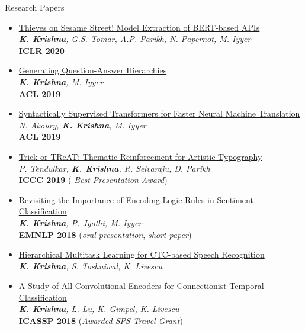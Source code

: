 \documentclass{resume} %
\begin{document}
\begin{rSection}{Research Papers}
\vspace*{0.1in}
\begin{itemize}[leftmargin=*]
\item \href{https://arxiv.org/abs/1910.12366}{Thieves on Sesame Street! Model Extraction of BERT-based APIs} \\ \textit{\textbf{K. Krishna}, G.S. Tomar, A.P. Parikh, N. Papernot, M. Iyyer} \\ \textbf{ICLR 2020}
\item \href{https://arxiv.org/abs/1906.02622}{Generating Question-Answer Hierarchies} \\ \textit{\textbf{K. Krishna}, M. Iyyer} \\ \textbf{ACL 2019}
\item \href{https://arxiv.org/abs/1906.02780}{Syntactically Supervised Transformers for Faster Neural Machine Translation} \\ \textit{N. Akoury, \textbf{K. Krishna}, M. Iyyer} \\ \textbf{ACL 2019}
\item \href{https://arxiv.org/abs/1903.07820}{Trick or TReAT: Thematic Reinforcement for Artistic Typography} \\ \textit{P. Tendulkar, \textbf{K. Krishna}, R. Selvaraju, D. Parikh} \\ \textbf{ICCC 2019} ({\color{red} \textit{Best Presentation Award}})
\item \href{https://arxiv.org/abs/1808.07733}{Revisiting the Importance of Encoding Logic Rules in Sentiment Classification} \\ \textit{\textbf{K. Krishna}, P. Jyothi, M. Iyyer} \\ \textbf{EMNLP 2018} ({\color{red}\textit{oral presentation}}, \textit{short paper})
\item \href{https://arxiv.org/abs/1807.06234}{Hierarchical Multitask Learning for CTC-based Speech Recognition} \\ \textit{\textbf{K. Krishna}, S. Toshniwal, K. Livescu}
\item \href{https://arxiv.org/abs/1710.10398}{A Study of All-Convolutional Encoders for Connectionist Temporal Classification}\\ \textit{\textbf{K. Krishna}, L. Lu, K. Gimpel,  K. Livescu}\\ \textbf{ICASSP 2018} ({\textit{Awarded SPS Travel Grant}})
\end{itemize}
\end{rSection}
\end{document}
